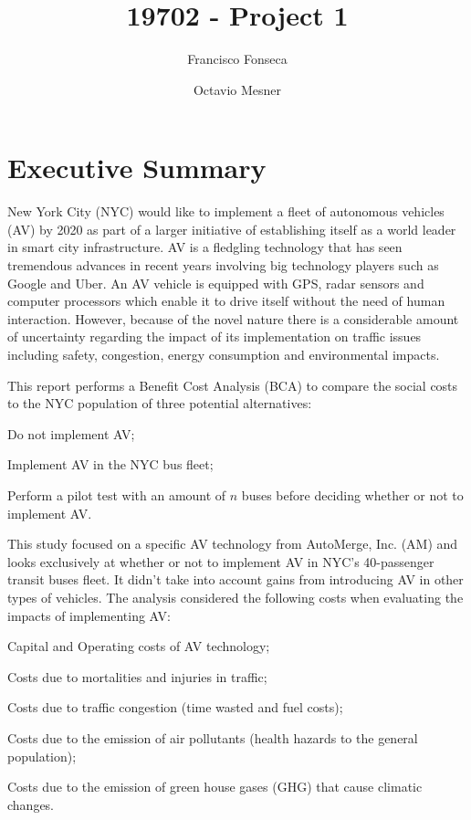 \documentclass[11pt, letterpaper]{article}
\title{\vspace{-2.5cm} 19702 - Project 1}
\author{Francisco Fonseca \and Octavio Mesner}
\date{\mydate}
\date{\mydateformat\normalsize\mydate} %
\begin{document}
\maketitle %

\section*{Executive Summary} \label{execsum}

New York City (NYC) would like to implement a fleet of autonomous
vehicles (AV) by 2020 as part of a larger initiative of establishing
itself as a world leader in smart city infrastructure. AV is a fledgling technology
that has seen tremendous advances in recent years involving
big technology players such as Google and Uber. An AV vehicle is equipped with
GPS, radar sensors and computer processors which enable it to drive itself without the
need of human interaction. However, because of the novel nature there is a considerable amount of
uncertainty regarding the impact of its implementation on traffic
issues including safety, congestion, energy consumption and environmental impacts. 

This report performs a Benefit Cost Analysis (BCA) to compare the social costs to the NYC population of three potential alternatives:
\begin{enumerate*}[label={(\arabic*)},font={\bfseries}]
\item Do not implement AV;
\item Implement AV in the NYC bus fleet;
\item Perform a pilot test with an amount of $n$ buses before deciding whether or not to implement AV.
\end{enumerate*}

This study focused on a specific AV technology from AutoMerge, Inc. (AM) and looks exclusively
at whether or not to implement AV in NYC's 40-passenger transit buses fleet. It didn't take into account
gains from introducing AV in other types of vehicles. The analysis considered the following costs when 
evaluating the impacts of implementing AV:
\begin{enumerate*}[label={(\alph*)},font={\bfseries}]
\item Capital and Operating costs of AV technology;
\item Costs due to mortalities and injuries in traffic;
\item Costs due to traffic congestion (time wasted and fuel costs);
\item Costs due to the emission of air pollutants (health hazards to the general population);
\item Costs due to the emission of green house gases (GHG) that cause climatic changes.
\end{enumerate*}
\end{document}
